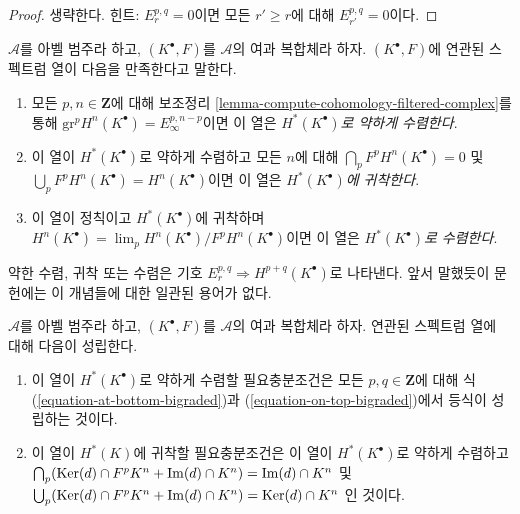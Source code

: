 \begin{proof}
생략한다. 힌트: $E_r^{p, q} = 0$이면 모든 $r' \geq r$에 대해
$E_{r'}^{p, q} = 0$이다.
\end{proof}

\begin{definition}
\label{definition-filtered-complex-ss-converges}
$\mathcal{A}$를 아벨 범주라 하고, $(K^\bullet, F)$를 $\mathcal{A}$의
여과 복합체라 하자. $(K^\bullet, F)$에 연관된 스펙트럼 열이 다음을
만족한다고 말한다.
\begin{enumerate}
\item 모든 $p, n \in \mathbf{Z}$에 대해 보조정리
\ref{lemma-compute-cohomology-filtered-complex}를 통해
$\text{gr}^pH^n(K^\bullet) = E_{\infty}^{p, n - p}$이면 이 열은
{\it $H^*(K^\bullet)$로 약하게 수렴한다}.
\item 이 열이 $H^*(K^\bullet)$로 약하게 수렴하고 모든 $n$에 대해
$\bigcap_p F^pH^n(K^\bullet) = 0$ 및
$\bigcup_p F^p H^n(K^\bullet) = H^n(K^\bullet)$이면 이 열은
{\it $H^*(K^\bullet)$에 귀착한다}.
\item 이 열이 정칙이고 $H^*(K^\bullet)$에 귀착하며
$H^n(K^\bullet) = \lim_p H^n(K^\bullet)/F^pH^n(K^\bullet)$이면 이 열은
{\it $H^*(K^\bullet)$로 수렴한다}.
\end{enumerate}
\end{definition}

\noindent
약한 수렴, 귀착 또는 수렴은 기호
$E_r^{p, q} \Rightarrow H^{p + q}(K^\bullet)$로 나타낸다. 앞서
말했듯이 문헌에는 이 개념들에 대한 일관된 용어가 없다.

\begin{lemma}
\label{lemma-filtered-complex-ss-converges}
$\mathcal{A}$를 아벨 범주라 하고, $(K^\bullet, F)$를 $\mathcal{A}$의
여과 복합체라 하자. 연관된 스펙트럼 열에 대해 다음이 성립한다.
\begin{enumerate}
\item 이 열이 $H^*(K^\bullet)$로 약하게 수렴할 필요충분조건은 모든
$p, q \in \mathbf{Z}$에 대해 식 (\ref{equation-at-bottom-bigraded})과
(\ref{equation-on-top-bigraded})에서 등식이 성립하는 것이다.
\item 이 열이 $H^*(K)$에 귀착할 필요충분조건은 이 열이
$H^*(K^\bullet)$로 약하게 수렴하고
$\bigcap_p (\mathop{\mathrm{Ker}}(d) \cap F^pK^n + \mathop{\mathrm{Im}}(d) \cap K^n) = \mathop{\mathrm{Im}}(d) \cap K^n$
및
$\bigcup_p (\mathop{\mathrm{Ker}}(d) \cap F^pK^n + \mathop{\mathrm{Im}}(d) \cap K^n) = \mathop{\mathrm{Ker}}(d) \cap K^n$
인 것이다.
\end{enumerate}
\end{lemma}


